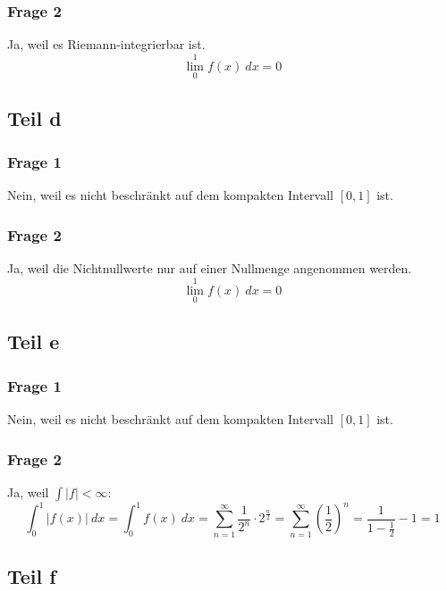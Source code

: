 \documentclass[10pt,a4paper]{article}
\begin{document}
\subsubsection{Frage 2}
Ja, weil es Riemann-integrierbar ist.
\begin{equation}
  \lim_{0}^{1} f(x)\ dx = 0
\end{equation}

\subsection{Teil d}

\subsubsection{Frage 1}
Nein, weil es nicht beschränkt auf dem kompakten Intervall $[0, 1]$ ist.

\subsubsection{Frage 2}
Ja, weil die Nichtnullwerte nur auf einer Nullmenge angenommen werden.
\begin{equation}
  \lim_{0}^{1} f(x)\ dx = 0
\end{equation}

\subsection{Teil e}

\subsubsection{Frage 1}
Nein, weil es nicht beschränkt auf dem kompakten Intervall $[0, 1]$ ist.

\subsubsection{Frage 2}
Ja, weil $\int |f| < \infty$:
\begin{equation}
  \int_{0}^{1} |f(x)|\ dx = \int_{0}^{1} f(x)\ dx = \sum_{n = 1}^{\infty} \frac{1}{2^{n}} \cdot 2^{\frac{n}{2}} = \sum_{n = 1}^{\infty} \left( \frac{1}{2} \right)^{n} = \frac{1}{1 - \frac{1}{2}} - 1 = 1
\end{equation}

\subsection{Teil f}
\end{document}

